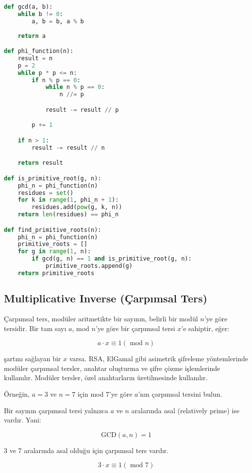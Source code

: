 \begin{lstlisting}[language=Python]
def gcd(a, b):
    while b != 0:
        a, b = b, a % b
        
    return a

def phi_function(n):
    result = n
    p = 2
    while p * p <= n:
        if n % p == 0:
            while n % p == 0:
                n //= p

            result -= result // p

        p += 1

    if n > 1:
        result -= result // n

    return result

def is_primitive_root(g, n):
    phi_n = phi_function(n)
    residues = set()
    for k in range(1, phi_n + 1):
        residues.add(pow(g, k, n))
    return len(residues) == phi_n

def find_primitive_roots(n):
    phi_n = phi_function(n)
    primitive_roots = []
    for g in range(1, n):
        if gcd(g, n) == 1 and is_primitive_root(g, n):
            primitive_roots.append(g)
    return primitive_roots
\end{lstlisting}

\newpage

\subsection{Multiplicative Inverse (Çarpımsal Ters)}

Çarpımsal ters, modüler aritmetikte bir sayının, belirli bir modül $n$'ye göre tersidir. Bir tam sayı $a$, mod $n$'ye göre bir çarpımsal tersi $x$'e sahiptir, eğer:

\[ a \cdot x \equiv 1 (\text{ mod } n) \]

şartını sağlayan bir $x$ varsa. RSA, ElGamal gibi asimetrik şifreleme yöntemlerinde modüler çarpımsal tersler, anahtar oluşturma ve şifre çözme işlemlerinde kullanılır. Modüler tersler, özel anahtarların üretilmesinde kullanılır.

Örneğin, $a = 3$ ve $n = 7$ için mod 7'ye göre $a$'nın çarpımsal tersini bulun.

Bir sayının çarpımsal tersi yalnızca $a$ ve $n$ aralarında asal (relatively prime) ise vardır. Yani:

\[ \text{GCD}(a, n) = 1\]

3 ve 7 aralarında asal olduğu için çarpımsal ters vardır.

\[ 3 \cdot x \equiv 1 (\text{ mod } 7) \]


